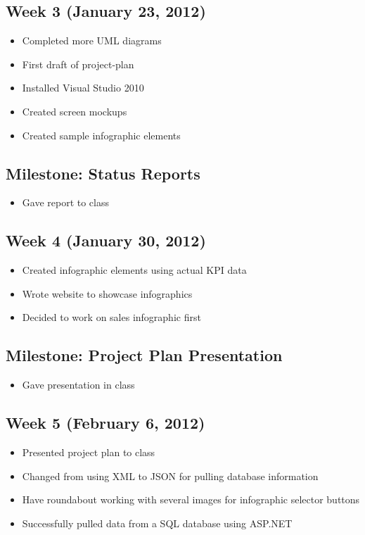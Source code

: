 \documentclass[11pt,a4paper,oneside]{article}
\begin{document}
\subsection{Week 3 (January 23, 2012)}
\begin{itemize}
\item Completed more UML diagrams
\item First draft of project-plan
\item Installed Visual Studio 2010
\item Created screen mockups
\item Created sample infographic elements
\end{itemize}

\subsection{Milestone: Status Reports}
\begin{itemize}
\item Gave report to class
\end{itemize}

\subsection{Week 4 (January 30, 2012)}
\begin{itemize}
\item Created infographic elements using actual KPI data
\item Wrote website to showcase infographics
\item Decided to work on sales infographic first
\end{itemize}

\subsection{Milestone: Project Plan Presentation}
\begin{itemize}
\item Gave presentation in class
\end{itemize}

\subsection{Week 5 (February 6, 2012)}
\begin{itemize}
\item Presented project plan to class
\item Changed from using XML to JSON for pulling database information
\item Have roundabout working with several images for infographic selector buttons
\item Successfully pulled data from a SQL database using ASP.NET
\end{itemize}
\end{document}
